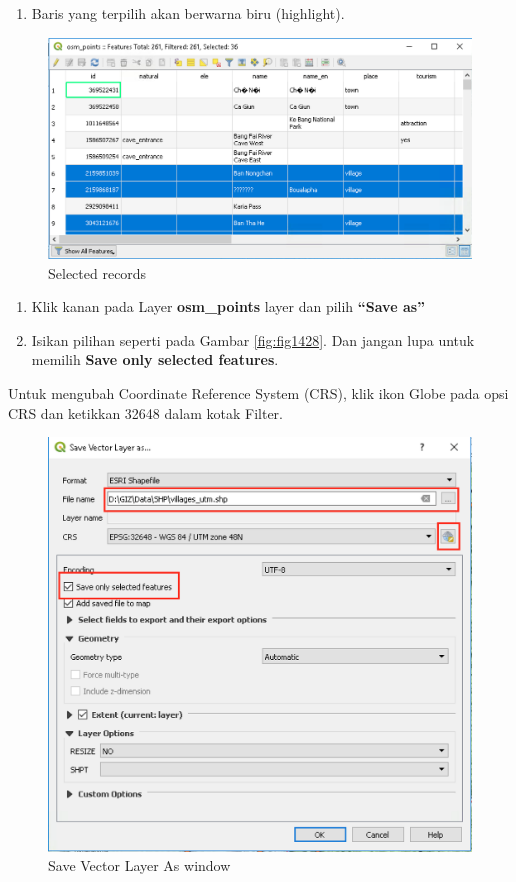\documentclass[]{book}
\providecommand{\tightlist}{%
  \setlength{\itemsep}{0pt}\setlength{\parskip}{0pt}}
\begin{document}
\begin{enumerate}
\def\labelenumi{\arabic{enumi}.}
\setcounter{enumi}{4}
\tightlist
\item
  Baris yang terpilih akan berwarna biru (highlight).
\end{enumerate}

\begin{figure}

{\centering \includegraphics[width=0.7\linewidth]{images/04/fig27} 

}

\caption{Selected records}\label{fig:fig1427}
\end{figure}

\begin{enumerate}
\def\labelenumi{\arabic{enumi}.}
\setcounter{enumi}{4}
\item
  Klik kanan pada Layer \textbf{osm\_points} layer dan pilih \textbf{``Save as''}
\item
  Isikan pilihan seperti pada Gambar \ref{fig:fig1428}. Dan jangan lupa untuk memilih \textbf{Save only selected features}.
\end{enumerate}

Untuk mengubah Coordinate Reference System (CRS), klik ikon Globe pada opsi CRS dan ketikkan 32648 dalam kotak Filter.

\begin{figure}

{\centering \includegraphics[width=0.7\linewidth]{images/04/fig29} 

}

\caption{Save Vector Layer As window}\label{fig:fig1429}
\end{figure}
\end{document}
